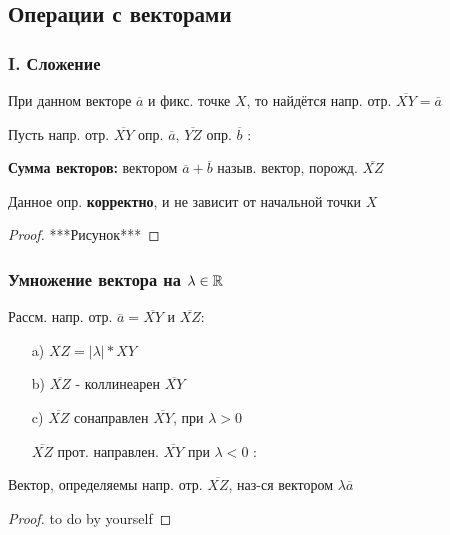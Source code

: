 \subsection{Операции с векторами}
\subsubsection{I. Сложение}
\begin{note}
При данном векторе $\overline{a}$ и фикс. точке $X$, то найдётся напр. отр. $\overline{XY} = \overline{a}$
\end{note}

\begin{definition}
Пусть напр. отр. $\overline{XY}$ опр. $\overline{a}$, $\overline{YZ}$ опр. $\overline{b}$ :

\textbf{Сумма векторов:} вектором $\overline{a} + \overline{b}$  назыв. вектор, порожд. $\overline{XZ}$
\end{definition}
\begin{note}
Данное опр. \textbf{корректно}, и не зависит от начальной точки $X$
\end{note}
\begin{proof}
***Рисунок***
\end{proof}

\subsubsection{Умножение вектора на $\lambda \in \mathbb{R}$}
Рассм. напр. отр. $\overline{a} = \overline{XY}$ и $\overline{XZ} \colon $
\begin{itemize}
    \item [a) ] $XZ = |\lambda| * XY$ 
    \item [b) ] $\overline{XZ}$ - коллинеарен $\overline{XY}$ 
    \item [c) ] $\overline{XZ}$ сонаправлен $\overline{XY}$, при $\lambda > 0$ 

        $\overline{XZ}$ прот. направлен. $\overline{XY}$ при $\lambda < 0$ :
\end{itemize}

Вектор, определяемы напр. отр. $\overline{XZ}$, наз-ся вектором $\lambda \overline{a}$ 

\begin{proof}
to do by yourself
\end{proof}

